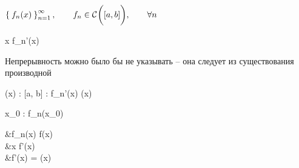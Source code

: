 \begin{theorem}
	$ \Set{f_n(x)}_{n=1}^{\infty}, \qquad f_n \in \mathcal{C}^{} \bigg( {[a, b]} \bigg) , \qquad \forall n $
	\begin{equ}{10}
		\forall x \in [a, b] \quad \exist f_n'(x)
	\end{equ}
	\begin{note}
		Непрерывность можно было бы не указывать -- она следует из существования производной
	\end{note}
	\begin{equ}{11}
		\exist \vphi(x) : [a, b]  \to \R : \quad f_n'(x)  \vphi(x)
	\end{equ}
	\begin{equ}{12}
		\exist x_0 \in [a, b] : \quad \exist {} f_n(x_0) \in \R
	\end{equ}
	\begin{mequ}
		&f_n(x)  f(x) \\
		 &\forall x \in [a, b] \quad \exist f'(x) \\
		 &f'(x) = \vphi(x)
	\end{mequ}
\end{theorem}

